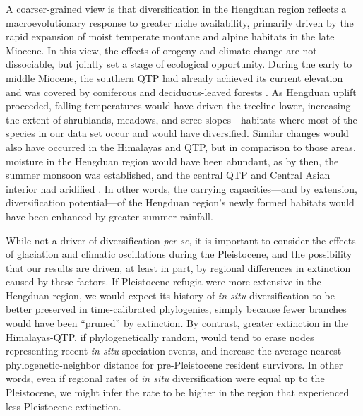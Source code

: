 A coarser-grained view is that diversification in the Hengduan region reflects a macroevolutionary response to greater niche availability, primarily driven by the rapid expansion of moist temperate montane and alpine habitats in the late Miocene. In this view, the effects of orogeny and climate change are not dissociable, but jointly set a stage of ecological opportunity. During the early to middle Miocene, the southern QTP had already achieved its current elevation \citep{Spicer2003} and was covered by coniferous and deciduous-leaved forests \citep{SunJ2014,LiH1976}%
. As Hengduan uplift proceeded, falling temperatures would have driven the treeline lower, increasing the extent of shrublands, meadows, and scree slopes---habitats where most of the species in our data set occur and would have diversified. Similar changes would also have occurred in the Himalayas and QTP, but in comparison to those areas, moisture in the Hengduan region would have been abundant, as by then, the summer monsoon was established, and the central QTP and Central Asian interior had aridified \citep[see][]{Renner2016}. In other words, the carrying capacities---and by extension, diversification potential---of the Hengduan region's newly formed habitats would have been enhanced by greater summer rainfall. 


While not a driver of diversification \textit{per se}, it is important to consider the effects of glaciation and climatic oscillations during the Pleistocene, and the possibility that our results are driven, at least in part, by regional differences in extinction caused by these factors. If Pleistocene refugia were more extensive in the Hengduan region, we would expect its history of \textit{in situ} diversification to be better preserved in time-calibrated phylogenies, simply because fewer branches would have been ``pruned'' by extinction. By contrast, greater extinction in the Himalayas-QTP, if phylogenetically random, would tend to erase nodes representing recent \textit{in situ} speciation events, and increase the average nearest-phylogenetic-neighbor distance for pre-Pleistocene resident survivors. In other words, even if regional rates of \textit{in situ} diversification were equal up to the Pleistocene, we might infer the rate to be higher in the region that experienced less Pleistocene extinction.

